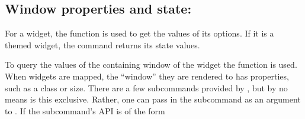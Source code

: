 









\subsection{Window properties and state: }
\label{sec:tcltk:overview:widget-properties}

For a widget, the function  is used to get the values
of its options. If it is a themed widget, the  command
returns its state values. 

To query the values of the containing window of the widget the
 function is used.  When widgets are mapped, the
``window'' they are rendered to has properties, such as a class or
size. There are a few subcommands provided by , but by no
means is this exclusive. Rather, one can pass in the subcommand as an
argument to . If the subcommand's API is of the form

